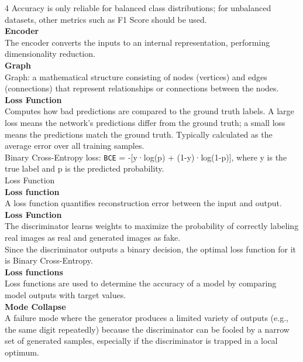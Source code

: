 \documentclass[8pt]{extarticle}
\begin{document}
\begin{multicols}{4}
Accuracy is only reliable for balanced class distributions; for unbalanced datasets, other metrics such as F1 Score should be used.\\
\vspace{2pt}\textbf{Encoder}\\
The encoder converts the inputs to an internal representation, performing dimensionality reduction.\\
\vspace{2pt}\textbf{Graph}\\
Graph: a mathematical structure consisting of nodes (vertices) and edges (connections) that represent relationships or connections between the nodes.\\
\vspace{2pt}\textbf{Loss Function}\\
Computes how bad predictions are compared to the ground truth labels. A large loss means the network's predictions differ from the ground truth; a small loss means the predictions match the ground truth. Typically calculated as the average error over all training samples.\\
Binary Cross-Entropy loss: \texttt{BCE} = -[y·log(p) + (1-y)·log(1-p)], where y is the true label and p is the predicted probability.\\
Loss Function\\
\vspace{2pt}\textbf{Loss function}\\
A loss function quantifies reconstruction error between the input and output.\\
\vspace{2pt}\textbf{Loss Function}\\
The discriminator learns weights to maximize the probability of correctly labeling real images as real and generated images as fake.\\
Since the discriminator outputs a binary decision, the optimal loss function for it is Binary Cross-Entropy.\\
\vspace{2pt}\textbf{Loss functions}\\
Loss functions are used to determine the accuracy of a model by comparing model outputs with target values.\\
\vspace{2pt}\textbf{Mode Collapse}\\
A failure mode where the generator produces a limited variety of outputs (e.g., the same digit repeatedly) because the discriminator can be fooled by a narrow set of generated samples, especially if the discriminator is trapped in a local optimum.\\


\end{multicols}
\end{document}
